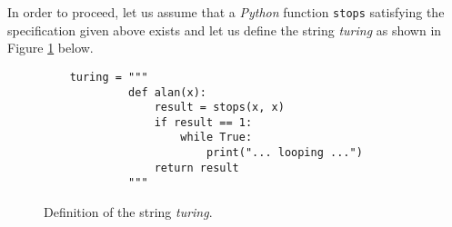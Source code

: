 In order to proceed, let us assume that a \textsl{Python} function \texttt{stops}
satisfying the specification given above exists and let us define the string
\textsl{turing} as shown in Figure \ref{fig:turing-string} below.

\begin{figure}[!h]
  \centering
\begin{verbatim}  
    turing = """
             def alan(x):
                 result = stops(x, x)
                 if result == 1:
                     while True:
                         print("... looping ...")
                 return result
             """ 
\end{verbatim}
  \vspace*{-0.3cm}
  \caption{Definition of the string \textsl{turing}.}
  \label{fig:turing-string}
\end{figure}

